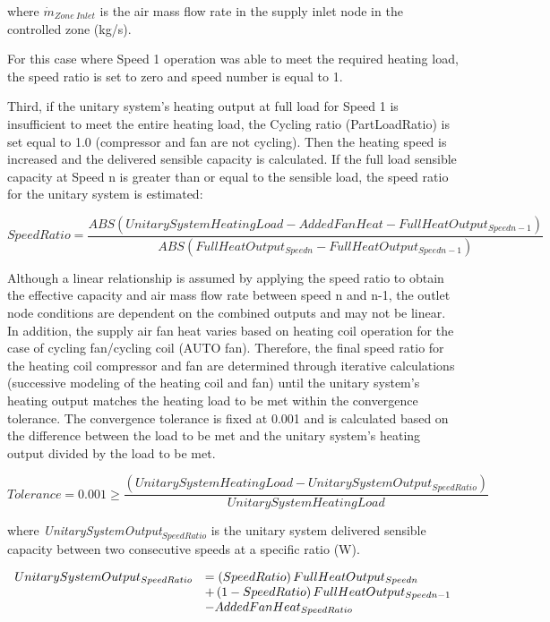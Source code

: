where \({\dot m_{Zone~Inlet}}\) is the air mass flow rate in the supply inlet node in the controlled zone (kg/s).

For this case where Speed 1 operation was able to meet the required heating load, the speed ratio is set to zero and speed number is equal to 1.

Third, if the unitary system's heating output at full load for Speed 1 is insufficient to meet the entire heating load, the Cycling ratio (PartLoadRatio) is set equal to 1.0 (compressor and fan are not cycling). Then the heating speed is increased and the delivered sensible capacity is calculated. If the full load sensible capacity at Speed n is greater than or equal to the sensible load, the speed ratio for the unitary system is estimated:

\begin{equation}
SpeedRatio = \frac{{ABS\left( {UnitarySystemHeatingLoad - AddedFanHeat - FullHeatOutpu{t_{Speedn - 1}}} \right)}}{{ABS\left( {FullHeatOutpu{t_{Speedn}} - FullHeatOutpu{t_{Speedn - 1}}} \right)}}
\end{equation}

Although a linear relationship is assumed by applying the speed ratio to obtain the effective capacity and air mass flow rate between speed n and n-1, the outlet node conditions are dependent on the combined outputs and may not be linear. In addition, the supply air fan heat varies based on heating coil operation for the case of cycling fan/cycling coil (AUTO fan). Therefore, the final speed ratio for the heating coil compressor and fan are determined through iterative calculations (successive modeling of the heating coil and fan) until the unitary system's heating output matches the heating load to be met within the convergence tolerance. The convergence tolerance is fixed at 0.001 and is calculated based on the difference between the load to be met and the unitary system's heating output divided by the load to be met.

\begin{equation}
Tolerance = 0.001 \ge \frac{{\left( {UnitarySystemHeatingLoad - UnitarySystemOutpu{t_{SpeedRatio}}} \right)}}{{UnitarySystemHeatingLoad}}
\end{equation}

where \emph{UnitarySystemOutput\(_{SpeedRatio}\)} is the unitary system delivered sensible capacity between two consecutive speeds at a specific ratio (W).

\begin{equation}
  \begin{array}{rl}
    UnitarySystemOutput_{SpeedRatio} &= \left(SpeedRatio\right) FullHeatOutput_{Speedn} \\
                                     &+ \left(1 - SpeedRatio\right) FullHeatOutput_{Speedn-1} \\ 
                                     &- AddedFanHeat_{SpeedRatio}
  \end{array}
\end{equation}

